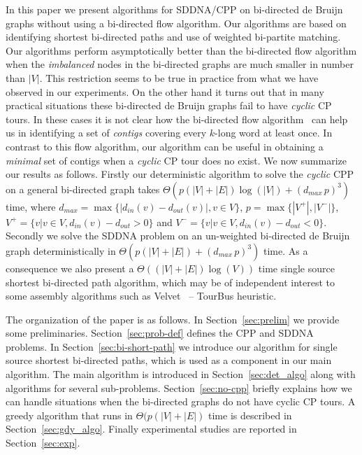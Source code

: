 \documentclass[runningheads]{llncs}
\begin{document}
In this paper we present algorithms for SDDNA/CPP  on bi-directed de Bruijn graphs without
using a bi-directed flow algorithm. Our algorithms are based on identifying shortest bi-directed
paths and use of weighted bi-partite matching. Our algorithms perform asymptotically better than the bi-directed flow algorithm when the {\em imbalanced} nodes in the bi-directed graphs are much smaller in number than $|V|$. This restriction seems to be true in practice from what we have observed in our experiments. On 
the other hand it turns out that in many practical situations these bi-directed de Bruijn graphs 
fail to have {\em cyclic} CP tours. In these cases it is not clear how the bi-directed flow 
algorithm~\cite{bidirected_graph} can help us in identifying a set of {\em contigs} covering every 
$k$-long word at least once. In contrast to this flow algorithm, our algorithm can be useful
in obtaining a {\em minimal} set of contigs when a {\em cyclic} CP tour does no exist. We now
summarize our results as follows. Firstly our deterministic algorithm to solve the {\em cyclic}
CPP on a general bi-directed graph takes $\Theta(p(|V|+|E|)\log(|V|) + (d_{max}\,p)^3)$ time, 
where $d_{max} = \max\{|d_{in}(v)-d_{out}(v)|, v\in V\}$, $p = \max\{|V^+|, |V^-|\}$, 
$V^+ = \{v | v\in V, d_{in}(v)-d_{out} > 0\}$ and $V^- = \{v | v\in V, d_{in}(v) - d_{out} < 0\}$.
Secondly we solve the SDDNA problem on an un-weighted bi-directed de Bruijn graph deterministically 
in $\Theta(p(|V|+|E|) +(d_{max}\,p)^3)$ time. As a consequence we also present a $\Theta((|V|+|E|)\log(V))$ 
time single source shortest bi-directed path algorithm, which may be of independent interest to 
some assembly algorithms such as Velvet~\cite{velvet08} -- TourBus heuristic.


The organization of the paper is as follows. In Section~\ref{sec:prelim} we provide some preliminaries. 
Section~\ref{sec:prob-def} defines the CPP and SDDNA problems. In Section~\ref{sec:bi-short-path} we
introduce our algorithm for single source shortest bi-directed paths, which is used as a component
in our main algorithm. The main algorithm is introduced in Section~\ref{sec:det_algo} along with
algorithms for several sub-problems. Section~\ref{sec:no-cpp} briefly explains how we can handle situations when
the bi-directed graphs do not have cyclic CP tours. A greedy algorithm that runs in $\Theta(p(|V|+|E|)$ time
is described in Section~\ref{sec:gdy_algo}. Finally experimental studies are reported in 
Section~\ref{sec:exp}.
\end{document}
